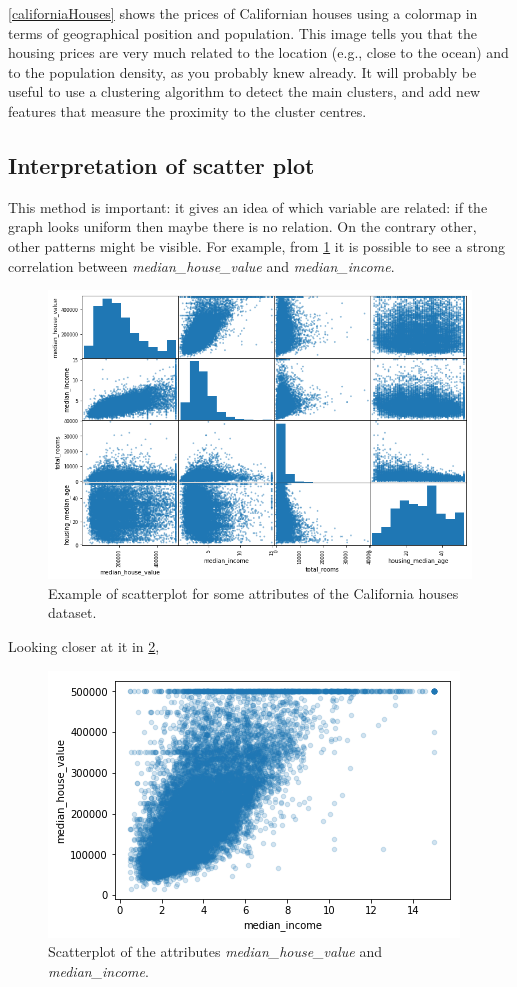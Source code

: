 \documentclass[12pt, letterpaper]{article}
\theoremstyle{definition}
\let\ti\textit
\begin{document}
\ref{californiaHouses} shows the prices of Californian houses using a colormap in terms of geographical position and population.
This image tells you that the housing prices are very much related to the location (e.g., close to the ocean) and to the population density, as you probably knew already. It will probably be useful to use a clustering algorithm to detect the main clusters, and add new features that measure the proximity to the cluster centres. 

\subsection{Interpretation of scatter plot}
\label{scatterplot}
This method is important: it gives an idea of which variable are related: if the graph looks uniform then maybe there is no relation. On the contrary other, other patterns might be visible. For example, from \ref{scatter_img} it is possible to see a strong correlation between \ti{median\_house\_value} and \ti{median\_income}.
\begin{figure}
\centering
\includegraphics[scale=0.53]{img/scatterplot}
\caption{Example of scatterplot for some attributes of the California houses dataset.}
\label{scatter_img}
\end{figure}

Looking closer at it in \ref{singleScatterPlot},
\begin{figure}
\centering
\includegraphics[scale=0.8]{img/singleScatterPlot}
\caption{Scatterplot of the attributes \ti{median\_house\_value} and \ti{median\_income}.}
\label{singleScatterPlot}
\end{figure}
\end{document}

